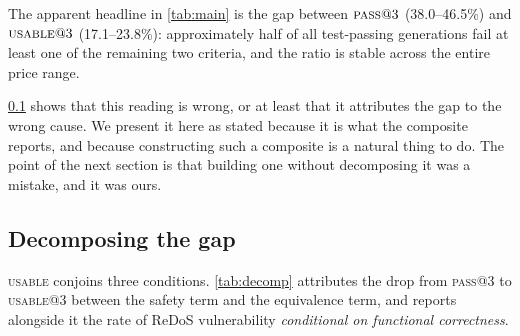 \documentclass[11pt]{article}
\newcommand{\pass}{\textsc{pass}}
\newcommand{\usable}{\textsc{usable}}
\begin{document}
\begin{table}[htbp]
\centering
\footnotesize
\setlength{\tabcolsep}{3pt}

\caption{Primary results, $n=k=3$. All figures percentages except $n$ (tasks
entering the @3 estimate) and \emph{undec.} (tasks whose equivalence is
undecidable). Tasks that returned fewer than three samples are excluded from
the estimate rather than scored on what arrived (\cref{sec:metrics}), which is
why $n$ varies; failed requests are itemised in \cref{app:failures}. The
interval is a paired bootstrap over tasks (\cref{sec:paired}), not an
independent binomial one: every model answers the same items, and a binomial
interval here would be the estimator this paper spends \cref{sec:paired}
arguing against. Ordering is by \usable{}@3 and should be read as a banding,
not a ranking (\cref{sec:power}) --- the intervals overlap almost everywhere,
which is the point.}
\label{tab:main}
\end{table}

The apparent headline in \cref{tab:main} is the gap between $\pass{}@3$
(38.0--46.5\%) and $\usable{}@3$ (17.1--23.8\%): approximately half of all
test-passing generations fail at least one of the remaining two criteria, and
the ratio is stable across the entire price range.

\cref{sec:decomp} shows that this reading is wrong, or at least that it
attributes the gap to the wrong cause. We present it here as stated because it
is what the composite reports, and because constructing such a composite is a
natural thing to do. The point of the next section is that building one
without decomposing it was a mistake, and it was ours.

\subsection{Decomposing the gap}
\label{sec:decomp}

\usable{} conjoins three conditions. \cref{tab:decomp} attributes the drop
from \pass{}@3 to \usable{}@3 between the safety term and the equivalence
term, and reports alongside it the rate of ReDoS vulnerability
\emph{conditional on functional correctness}.

\begin{table}[htbp]
\centering
\footnotesize
\setlength{\tabcolsep}{4pt}

\caption{Decomposition of the \pass{}$\to$\usable{} gap. ``C\&S'' is
correct-and-secure: correctness conjoined with safety, omitting the
equivalence term. The final column is the share of functionally correct
patterns that are ReDoS-vulnerable, and is the one column here computed
\emph{per sample} rather than @3: it is a rate over generations, and the @3
form would answer a different question. Denominators are \cref{tab:at1}'s
restricted ones --- tasks with fewer than three samples are excluded --- which
is why \texttt{kimi-k3} reads 46.5 here.}
\label{tab:decomp}
\end{table}
\end{document}
